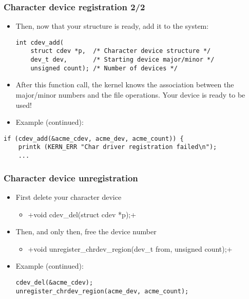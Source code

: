 \begin{frame}[fragile]
  \frametitle{Character device registration 2/2}
  \begin{itemize}
  \item Then, now that your structure is ready, add it to the system:
\begin{verbatim}
int cdev_add(
    struct cdev *p,  /* Character device structure */
    dev_t dev,       /* Starting device major/minor */
    unsigned count); /* Number of devices */
\end{verbatim}
  \item After this function call, the kernel knows the association
  between the major/minor numbers and the file operations. Your device
  is ready to be used!
  \item Example (continued):
\end{itemize}
\begin{verbatim}
if (cdev_add(&acme_cdev, acme_dev, acme_count)) {
    printk (KERN_ERR "Char driver registration failed\n");
    ...
\end{verbatim}
\end{frame}

\begin{frame}[fragile]
  \frametitle{Character device unregistration}
  \begin{itemize}
  \item First delete your character device
    \begin{itemize}
    \item {}+void cdev_del(struct cdev *p);+
    \end{itemize}
  \item Then, and only then, free the device number
    \begin{itemize}
    \item {}+void unregister_chrdev_region(dev_t from, unsigned count);+
    \end{itemize}
  \item Example (continued):
\begin{verbatim}
cdev_del(&acme_cdev);
unregister_chrdev_region(acme_dev, acme_count);
\end{verbatim}
  \end{itemize}
\end{frame}

